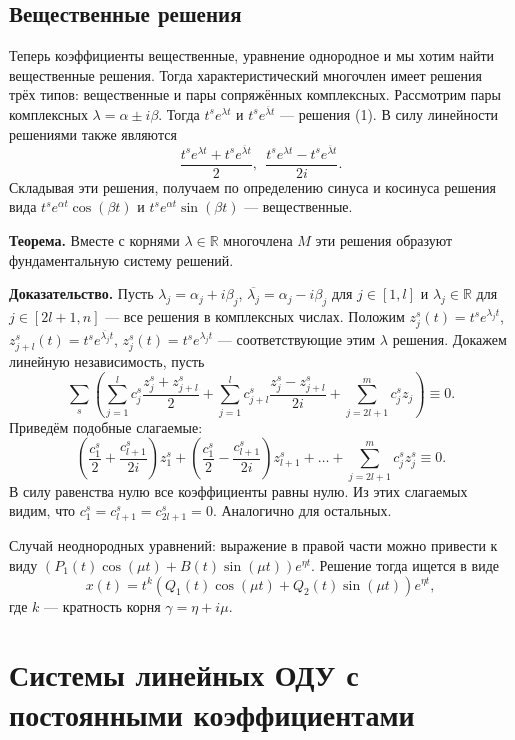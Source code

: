 \subsection{Вещественные решения}
Теперь коэффициенты вещественные, уравнение однородное и мы хотим найти вещественные решения.
Тогда характеристический многочлен имеет решения трёх типов: вещественные и пары сопряжённых комплексных.
Рассмотрим пары комплексных $\lambda = \alpha \pm i \beta$.
Тогда $t^s e^{\lambda t}$ и $t^s e^{\overline{\lambda} t}$ --- решения (1).
В силу линейности решениями также являются
\[
    \frac{t^s e^{\lambda t} + t^s e^{\overline \lambda t}}{2},~~
    \frac{t^s e^{\lambda t} - t^s e^{\overline \lambda t}}{2i}.
\]
Складывая эти решения, получаем по определению синуса и косинуса решения вида $t^s e^{\alpha t} \cos(\beta t)$ и $t^s e^{\alpha t} \sin(\beta t)$ --- вещественные.

\textbf{Теорема.} Вместе с корнями $\lambda \in \mathbb R$ многочлена $M$ эти решения образуют фундаментальную систему решений.

\textbf{Доказательство.} Пусть $\lambda_j = \alpha_j + i \beta_j$, $\overline{\lambda_j} = \alpha_j - i \beta_j$ для $j \in [1, l]$ и $\lambda_j \in \mathbb R$ для $j \in [2l + 1, n]$ --- все решения в комплексных числах.
Положим $z_j^s(t) = t^s e^{\lambda_j t}$, $z_{j+l}^s(t) = t^s e^{\overline{\lambda_j} t}$, $z_j^s(t) = t^s e^{\lambda_j t}$ --- соответствующие этим $\lambda$ решения.
Докажем линейную независимость, пусть
\[
    \sum_s \left(\sum_{j=1}^{l} c_j^s \frac{z_j^s + z_{j+l}^s}{2} + \sum_{j=1}^{l} c_{j+l}^s \frac{z_j^s - z_{j+l}^s}{2i} + \sum_{j=2l+1}^{m} c_j^s z_j \right) \equiv 0.
\]
Приведём подобные слагаемые:
\[
    \left( \frac{c_1^s}{2} + \frac{c_{l+1}^s}{2i} \right) z_1^s + \left( \frac{c_1^s}{2} - \frac{c_{l+1}^s}{2i} \right) z_{l+1}^s + \dots + \sum_{j=2l+1}^{m} c_j^s z_j^s \equiv 0.
\]
В силу равенства нулю все коэффициенты равны нулю.
Из этих слагаемых видим, что $c_1^s = c_{l+1}^s = c_{2l+1}^s = 0$.
Аналогично для остальных.

\QED

Случай неоднородных уравнений: выражение в правой части можно привести к виду $(P_1(t) \cos(\mu t) + B(t) \sin(\mu t)) e^{\eta t}$.
Решение тогда ищется в виде
\[
    x(t) = t^k (Q_1(t) \cos(\mu t) + Q_2(t) \sin(\mu t)) e^{\eta t},
\]
где $k$ --- кратность корня $\gamma = \eta + i \mu$.

\setcounter{equation}{0}
\section{Системы линейных ОДУ с постоянными коэффициентами}
